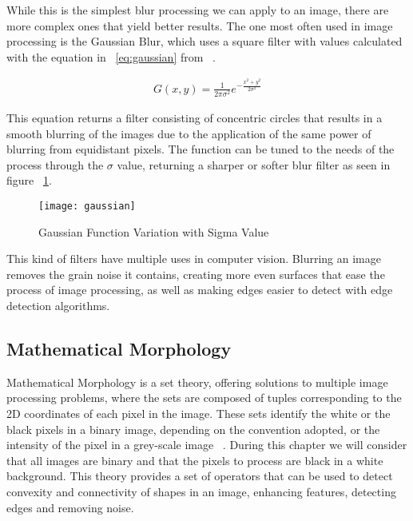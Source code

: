 While this is the simplest blur processing we can apply to an image, there are more complex ones that yield better results. The one most often used in image processing is the Gaussian Blur, which uses a square filter with values calculated with the equation in ~\ref{eq:gaussian} from ~\cite{shapiro_computer_2001}.

\begin{eqnarray}
\label{eq:gaussian}
G(x,y) = \frac{1}{2\pi \sigma ^{2}}e^{-\frac{x^{2}+y^{2}}{2\sigma ^{2}}}
\end{eqnarray}

This equation returns a filter consisting of concentric circles that results in a smooth blurring of the images due to the application of the same power of blurring from equidistant pixels. The function can be tuned to the needs of the process through the $\sigma$ value, returning a sharper or softer blur filter as seen in figure ~\ref{fig:gaussian}.

\begin{figure}[h]
  \begin{center}
    \leavevmode
    \texttt{[image: gaussian]}
    \caption{Gaussian Function Variation with Sigma Value}
    \label{fig:gaussian}
  \end{center}
\end{figure}

This kind of filters have multiple uses in computer vision. Blurring an image removes the grain noise it contains, creating more even surfaces that ease the process of image processing, as well as making edges easier to detect with edge detection algorithms.

\subsection{Mathematical Morphology}

Mathematical Morphology is a set theory, offering solutions to multiple image processing problems, where the sets are composed of tuples corresponding to the 2D coordinates of each pixel in the image. These sets identify the white or the black pixels in a binary image, depending on the convention adopted, or the intensity of the pixel in a grey-scale image ~\cite{dougherty_introduction_1992}. During this chapter we will consider that all images are binary and that the pixels to process are black in a white background. This theory provides a set of operators that can be used to detect convexity and connectivity of shapes in an image, enhancing features, detecting edges and removing noise. 

